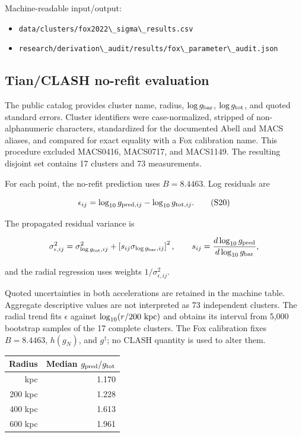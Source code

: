 \documentclass[utf8]{frontiers_suppmat}
\providecommand{\tightlist}{}
\newcommand{\passthrough}[1]{#1}
\begin{document}
Machine-readable input/output:

\begin{itemize}
\tightlist
\item
  \passthrough{\lstinline!data/clusters/fox2022\_sigma\_results.csv!}
\item
  \passthrough{\lstinline!research/derivation\_audit/results/fox\_parameter\_audit.json!}
\end{itemize}

\subsection{Tian/CLASH no-refit evaluation}\label{s6.2-tianclash-no-refit-evaluation}

The public catalog provides cluster name, radius, \(\log g_{\rm bar}\), \(\log g_{\rm tot}\), and quoted standard errors. Cluster identifiers were case-normalized, stripped of non-alphanumeric characters, standardized for the documented Abell and MACS aliases, and compared for exact equality with a Fox calibration name. This procedure excluded MACS0416, MACS0717, and MACS1149. The resulting disjoint set contains 17 clusters and 73 measurements.

For each point, the no-refit prediction uses \(B=8.4463\). Log residuals are

\[
\epsilon_{ij}
=\log_{10}g_{{\rm pred},ij}-\log_{10}g_{{\rm tot},ij}.
\tag{S20}
\]

The propagated residual variance is

\[
\sigma_{\epsilon,ij}^2
=\sigma_{\log g_{\rm tot},ij}^2
+\left[s_{ij}\sigma_{\log g_{\rm bar},ij}\right]^2,
\qquad
s_{ij}=\frac{d\log_{10}g_{\rm pred}}{d\log_{10}g_{\rm bar}},
\]

and the radial regression uses weights \(1/\sigma_{\epsilon,ij}^2\).

Quoted uncertainties in both accelerations are retained in the machine table. Aggregate descriptive values are not interpreted as 73 independent clusters. The radial trend fits \(\epsilon\) against \(\log_{10}(r/200\ {\rm kpc})\) and obtains its interval from 5,000 bootstrap samples of the 17 complete clusters. The Fox calibration fixes \(B=8.4463\), \(h(g_N)\), and \(g^\dagger\); no CLASH quantity is used to alter them.

\begin{longtable}[]{@{}rr@{}}
\toprule\noalign{}
Radius & Median \(g_{\rm pred}/g_{\rm tot}\) \\
\midrule\noalign{}
\endhead
\bottomrule\noalign{}
\endlastfoot
100 kpc & 1.170 \\
200 kpc & 1.228 \\
400 kpc & 1.613 \\
600 kpc & 1.961 \\
\end{longtable}
\end{document}

